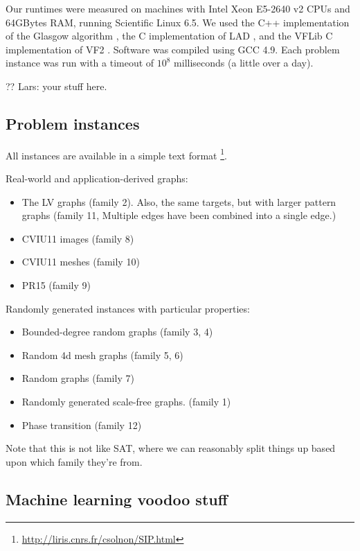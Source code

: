 \documentclass{llncs}
\begin{document}
Our runtimes were measured on machines with Intel Xeon E5-2640 v2 CPUs and 64GBytes RAM, running
Scientific Linux 6.5. We used the C++ implementation of the Glasgow algorithm \cite{McCreesh:2015},
the C implementation of LAD \cite{Solnon:2010}, and the VFLib C implementation of VF2
\cite{Cordella:2004}. Software was compiled using GCC 4.9. Each problem instance was run with a
timeout of $10^8$ milliseconds (a little over a day).

?? Lars: your stuff here.

\subsection{Problem instances}

All instances are available in a simple text format
\footnote{\url{http://liris.cnrs.fr/csolnon/SIP.html}}.

Real-world and application-derived graphs:

\begin{itemize}
    \item The LV graphs (family 2). Also, the same targets, but with larger pattern graphs (family
        11, Multiple edges have been combined into a single edge.)
    \item CVIU11 images (family 8)
    \item CVIU11 meshes (family 10)
    \item PR15 (family 9)
\end{itemize}

\noindent Randomly generated instances with particular properties:

\begin{itemize}
    \item Bounded-degree random graphs (family 3, 4) \cite{GraphDatabase}
    \item Random 4d mesh graphs (family 5, 6) \cite{GraphDatabase}
    \item Random graphs (family 7) \cite{GraphDatabase}
    \item Randomly generated scale-free graphs. (family 1) \cite{Solnon:2010}
    \item Phase transition (family 12)
\end{itemize}

\noindent Note that this is not like SAT, where we can reasonably split things up based upon which
family they're from.

\subsection{Machine learning voodoo stuff}
\end{document}
